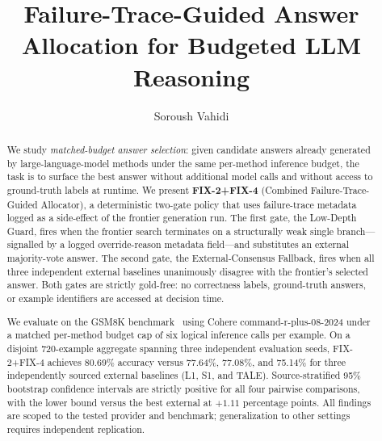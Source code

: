 \documentclass[smallextended]{svjour3}
\begin{document}
\title{Failure-Trace-Guided Answer Allocation for Budgeted LLM Reasoning}

\author{Soroush Vahidi}


\date{}
\maketitle

\begin{abstract}
We study \emph{matched-budget answer selection}: given candidate answers already
generated by large-language-model methods under the same per-method inference
budget, the task is to surface the best answer without additional model calls and
without access to ground-truth labels at runtime.
We present \textbf{FIX-2+FIX-4} (Combined Failure-Trace-Guided Allocator),
a deterministic two-gate policy that uses failure-trace metadata logged as a
side-effect of the frontier generation run.
The first gate, the Low-Depth Guard, fires when the frontier search terminates
on a structurally weak single branch---signalled by a logged override-reason
metadata field---and substitutes an external majority-vote answer.
The second gate, the External-Consensus Fallback, fires when all three independent
external baselines unanimously disagree with the frontier's selected answer.
Both gates are strictly gold-free: no correctness labels, ground-truth answers,
or example identifiers are accessed at decision time.

We evaluate on the GSM8K benchmark~\citep{cobbe2021training} using
Cohere command-r-plus-08-2024 under a matched per-method budget cap of six
logical inference calls per example.
On a disjoint 720-example aggregate spanning three independent evaluation seeds,
FIX-2+FIX-4 achieves 80.69\% accuracy versus 77.64\%, 77.08\%, and 75.14\% for
three independently sourced external baselines (L1, S1, and TALE).
Source-stratified 95\% bootstrap confidence intervals are strictly positive for
all four pairwise comparisons, with the lower bound versus the best external
at $+1.11$ percentage points.
All findings are scoped to the tested provider and benchmark; generalization to
other settings requires independent replication.
\end{abstract}
\end{document}

